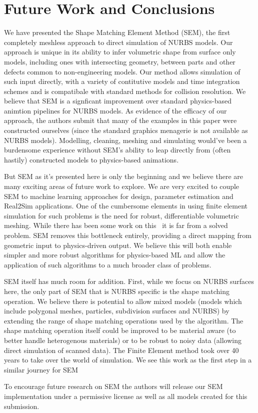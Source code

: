 \section{Future Work and Conclusions}
We have presented the Shape Matching Element Method (SEM), the first completely meshless approach to direct simulation of NURBS models.
Our approach is unique in its ability to infer volumetric shape from surface only models,
including ones with intersecting geometry, between parts and other defects common to non-engineering models.
Our method allows simulation of such input directly, with a variety of contitutive models and time integration schemes
and is compatibale with standard methods for collision resolution. 
We believe that SEM is a signficant improvement over standard physics-based animtion pipelines for NURBS models. 
As evidence of the efficacy of our approach, the authors submit that many of the examples in this paper were constructed ourselves
(since the standard graphics menagerie is not available as NURBS models). 
Modelling, cleaning, meshing and simulating would've been a burdensome experience without SEM's
ability to leap directly from (often hastily) constructed models to physics-based animations.

But SEM as it's presented here is only the beginning and we believe there are many exciting areas of future work to explore.
We are very excited to couple SEM to machine learning approaches for design, parameter estimation and Real2Sim applications.
One of the cumbersome elements in using finite element simulation for such problems is the need for robust, differentiable volumetric meshing.
While there has been some work on this~ it is far from a solved problem.
SEM removes this bottleneck entirely, providing a direct mapping from geometric input to physics-driven output. 
We believe this will both enable simpler and more robust algorithms for  physics-based ML and 
allow the application of such algorithms to a much broader class of problems. 

SEM itself has much room for addition.
First, while we focus on NURBS surfaces here, the only part of SEM that is NURBS specific is the shape matching operation.
We believe there is potential to allow mixed models (models which include polygonal meshes, particles, subdivision surfaces and NURBS)
by extending the range of shape matching operations used by the algorithm. The shape matching operation itself could be improved to be material aware 
(to better handle heterogenous materials) or to be robust to noisy data (allowing direct simulation of scanned data). The Finite Element method took over 
40 years to take over the world of simulation. 
We see this work as the first step in a similar journey for SEM

To encourage future research on SEM the authors will release our SEM implementation under a permissive license as well as all models created for this submission.
